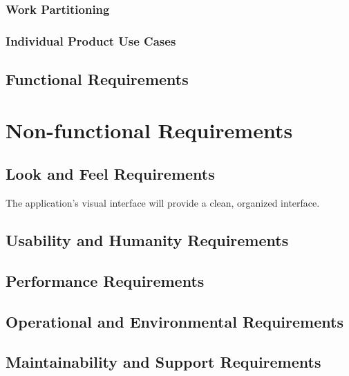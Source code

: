 \documentclass[12pt, titlepage]{article}
\begin{document}
    \subsubsection{Work Partitioning}

    \subsubsection{Individual Product Use Cases}

  \subsection{Functional Requirements}

\section{Non-functional Requirements}

  \subsection{Look and Feel Requirements}
  The application's visual interface will provide a clean, organized interface.

  \subsection{Usability and Humanity Requirements}

  \subsection{Performance Requirements}

  \subsection{Operational and Environmental Requirements}

  \subsection{Maintainability and Support Requirements}
\end{document}
